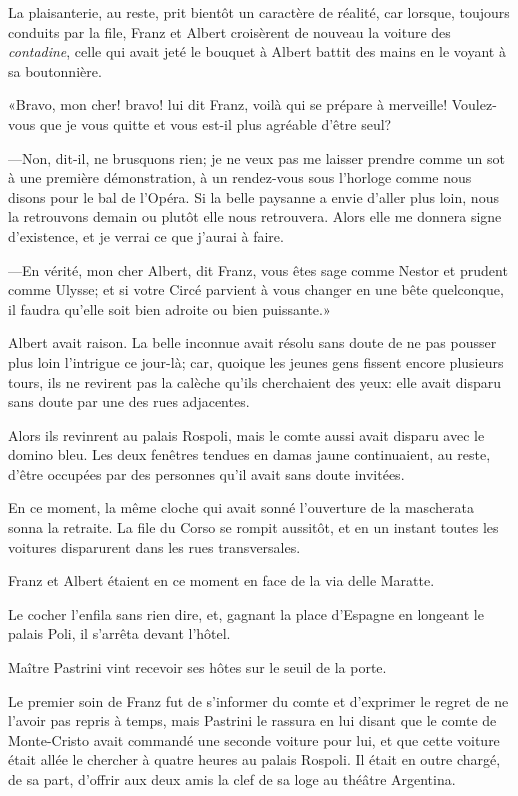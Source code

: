 La plaisanterie, au reste, prit bientôt un caractère de réalité, car lorsque, toujours conduits par la file, Franz et Albert croisèrent de nouveau la voiture des \textit{contadine}, celle qui avait jeté le bouquet à Albert battit des mains en le voyant à sa boutonnière. 

«Bravo, mon cher! bravo! lui dit Franz, voilà qui se prépare à merveille! Voulez-vous que je vous quitte et vous est-il plus agréable d'être seul? 

—Non, dit-il, ne brusquons rien; je ne veux pas me laisser prendre comme un sot à une première démonstration, à un rendez-vous sous l'horloge comme nous disons pour le bal de l'Opéra. Si la belle paysanne a envie d'aller plus loin, nous la retrouvons demain ou plutôt elle nous retrouvera. Alors elle me donnera signe d'existence, et je verrai ce que j'aurai à faire. 

—En vérité, mon cher Albert, dit Franz, vous êtes sage comme Nestor et prudent comme Ulysse; et si votre Circé parvient à vous changer en une bête quelconque, il faudra qu'elle soit bien adroite ou bien puissante.» 

Albert avait raison. La belle inconnue avait résolu sans doute de ne pas pousser plus loin l'intrigue ce jour-là; car, quoique les jeunes gens fissent encore plusieurs tours, ils ne revirent pas la calèche qu'ils cherchaient des yeux: elle avait disparu sans doute par une des rues adjacentes. 

Alors ils revinrent au palais Rospoli, mais le comte aussi avait disparu avec le domino bleu. Les deux fenêtres tendues en damas jaune continuaient, au reste, d'être occupées par des personnes qu'il avait sans doute invitées. 

En ce moment, la même cloche qui avait sonné l'ouverture de la mascherata sonna la retraite. La file du Corso se rompit aussitôt, et en un instant toutes les voitures disparurent dans les rues transversales. 

Franz et Albert étaient en ce moment en face de la via delle Maratte. 

Le cocher l'enfila sans rien dire, et, gagnant la place d'Espagne en longeant le palais Poli, il s'arrêta devant l'hôtel. 

Maître Pastrini vint recevoir ses hôtes sur le seuil de la porte. 

Le premier soin de Franz fut de s'informer du comte et d'exprimer le regret de ne l'avoir pas repris à temps, mais Pastrini le rassura en lui disant que le comte de Monte-Cristo avait commandé une seconde voiture pour lui, et que cette voiture était allée le chercher à quatre heures au palais Rospoli. Il était en outre chargé, de sa part, d'offrir aux deux amis la clef de sa loge au théâtre Argentina. 

